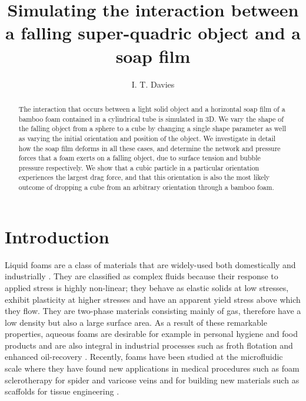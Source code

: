 \documentclass[preprint]{revtex4-1}
\begin{document}
\title{Simulating the interaction between a falling super-quadric object and a soap film}


\author{I. T. Davies} 



\begin{abstract}
The interaction that occurs between a light solid object and a horizontal soap film of a bamboo foam contained in a cylindrical tube is simulated in 3D. We vary the shape of the falling object from a sphere to a cube by changing a single shape parameter as well as varying the initial orientation and position of the object. We investigate in detail how the soap film deforms in all these cases, and determine the network and pressure forces that a foam exerts on a falling object, due to surface tension and bubble pressure respectively. We show that a cubic particle in a particular orientation experiences the largest drag force, and that this orientation is also the most likely outcome of dropping a cube from an arbitrary orientation through a bamboo foam.   
\end{abstract}

\maketitle


\section{Introduction}
	\label{sec:Introduction}
	
	
Liquid foams are a class of materials that are widely-used both domestically and industrially \cite{FrenchBook,Weaire2000}. They are classified as complex fluids because their response to applied stress is highly non-linear; they behave as elastic solids at low stresses, exhibit plasticity at higher stresses and have an apparent yield stress above which they flow. They are two-phase materials consisting mainly of gas, therefore have a low density but also a large surface area. As a result of these remarkable properties, aqueous foams are desirable for example in personal hygiene and food products and are also integral in industrial processes such as froth flotation \cite{Prudhomme96,Shean11} and enhanced oil-recovery \cite{Rossen96,Sheng13}. Recently, foams have been studied at the microfluidic scale \cite{Drenckhan05,Raven06} where they have found new applications in medical procedures such as foam sclerotherapy for spider and varicose veins and for building new materials such as scaffolds for tissue engineering \cite{Huerre14,Whitesides06}. 
\end{document}
